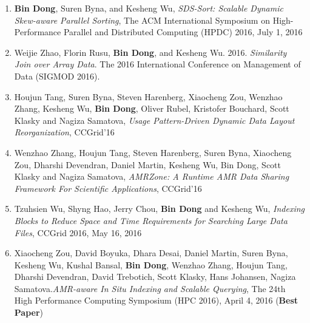 \documentclass[letterpaper,11pt]{article}
\begin{document}
\begin{enumerate}[1)]
\item \textbf{Bin Dong}, Suren Byna, and Kesheng Wu, \textit{SDS-Sort: Scalable Dynamic Skew-aware Parallel Sorting}, The ACM International Symposium on High-Performance Parallel and Distributed Computing (HPDC) 2016, July 1, 2016
\item Weijie Zhao, Florin Rusu, \textbf{Bin Dong}, and Kesheng Wu. 2016. \textit{Similarity Join over Array Data}. The 2016 International Conference on Management of Data (SIGMOD 2016). 
\item Houjun Tang, Suren Byna, Steven Harenberg, Xiaocheng Zou, Wenzhao Zhang, Kesheng Wu, \textbf{Bin Dong}, Oliver Rubel, Kristofer Bouchard, Scott Klasky and Nagiza Samatova, \textit{Usage Pattern-Driven Dynamic Data Layout Reorganization}, CCGrid'16
\item Wenzhao Zhang, Houjun Tang, Steven Harenberg, Suren Byna, Xiaocheng Zou, Dharshi Devendran, Daniel Martin, Kesheng Wu, Bin Dong, Scott Klasky and Nagiza Samatova, \textit{AMRZone: A Runtime AMR Data Sharing Framework For Scientific Applications}, CCGrid'16 
\item Tzuhsien Wu, Shyng Hao, Jerry Chou, \textbf{Bin Dong} and Kesheng Wu, \textit{Indexing Blocks to Reduce Space and Time Requirements for Searching Large Data Files}, CCGrid 2016, May 16, 2016
	\item Xiaocheng Zou, David Boyuka, Dhara Desai, Daniel Martin, Suren Byna, Kesheng Wu, Kushal Bansal, \textbf{Bin Dong}, Wenzhao Zhang, Houjun Tang, Dharshi Devendran, David Trebotich, Scott Klasky, Hans Johansen, Nagiza Samatova.\textit{AMR-aware In Situ Indexing and Scalable Querying}, The 24th High Performance Computing Symposium (HPC 2016), April 4, 2016 (\textbf{Best Paper})


\end{enumerate}
\end{document}
